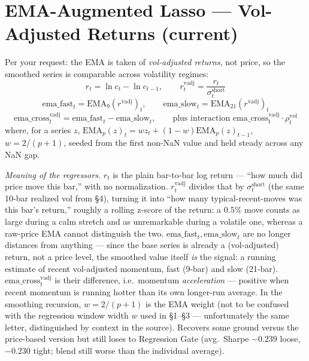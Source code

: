 \documentclass[11pt]{article}
\newcommand{\meaningpar}[1]{\par\noindent\textit{Meaning of the regressors.} #1}
\begin{document}
\section{EMA-Augmented Lasso --- Vol-Adjusted Returns (current)}
Per your request: the EMA is taken of \emph{vol-adjusted returns}, not price, so the smoothed
series is comparable across volatility regimes:
\[
r_t = \ln c_t - \ln c_{t-1}, \qquad
r^{\mathrm{vadj}}_t = \frac{r_t}{\sigma^{\mathrm{short}}_t}
\]
\[
\mathrm{ema\_fast}_t = \mathrm{EMA}_9(r^{\mathrm{vadj}})_t, \qquad
\mathrm{ema\_slow}_t = \mathrm{EMA}_{21}(r^{\mathrm{vadj}})_t
\]
\[
\mathrm{ema\_cross}^{\mathrm{vadj}}_t = \mathrm{ema\_fast}_t - \mathrm{ema\_slow}_t, \qquad
\text{plus interaction } \mathrm{ema\_cross}^{\mathrm{vadj}}_t \cdot \rho^{\mathrm{vol}}_t
\]
where, for a series $z$, $\mathrm{EMA}_p(z)_t = w z_t + (1-w)\mathrm{EMA}_p(z)_{t-1}$,
$w = 2/(p+1)$, seeded from the first non-NaN value and held steady across any NaN gap.
\meaningpar{$r_t$ is the plain bar-to-bar log return --- ``how much did price move this bar,''
with no normalization. $r^{\mathrm{vadj}}_t$ divides that by $\sigma^{\mathrm{short}}_t$ (the same
10-bar realized vol from \S4), turning it into ``how many typical-recent-moves was this bar's
return,'' roughly a rolling z-score of the return: a $0.5\%$ move counts as large during a calm
stretch and as unremarkable during a volatile one, whereas a raw-price EMA cannot distinguish the
two. $\mathrm{ema\_fast}_t,\mathrm{ema\_slow}_t$ are no longer distances from anything --- since
the base series is already a (vol-adjusted) return, not a price level, the smoothed value itself
\emph{is} the signal: a running estimate of recent vol-adjusted momentum, fast (9-bar) and slow
(21-bar). $\mathrm{ema\_cross}^{\mathrm{vadj}}_t$ is their difference, i.e.\ momentum
\emph{acceleration} --- positive when recent momentum is running hotter than its own longer-run
average. In the smoothing recursion, $w=2/(p+1)$ is the EMA weight (not to be confused with the
regression window width $w$ used in \S1--\S3 --- unfortunately the same letter, distinguished by
context in the source). Recovers some ground versus the price-based version but still loses to
Regression Gate (avg.\ Sharpe $-0.239$ loose, $-0.230$ tight; blend still worse than the individual
average).}
\end{document}
